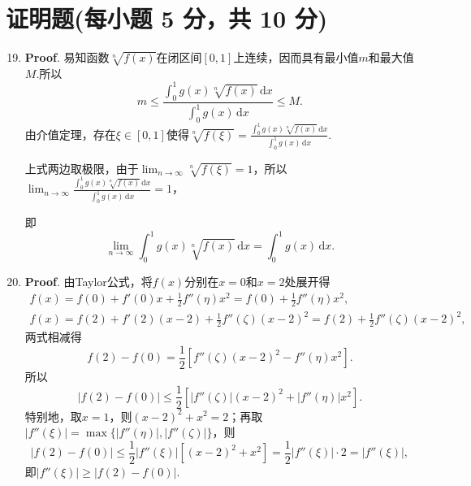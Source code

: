 \documentclass[../main.tex]{subfiles}
\begin{document}
\section{证明题(每小题 5 分，共 10 分)}
\begin{enumerate}
    \setcounter{enumi}{18}
    \item \textbf{Proof}. 易知函数$\sqrt[n]{f(x)}$在闭区间$[0,1]$上连续，因而具有最小值$m$和最大值$M$.所以
          \[
              m\leq \frac{\displaystyle\int_{0}^{1}g(x)\sqrt[n]{f(x)}\,\mathrm{d}x}{\displaystyle\int_{0}^{1}g(x)\,\mathrm{d}x}
              \leq M.
          \]
          由介值定理，存在$\xi\in[0,1]$使得$\sqrt[n]{f(\xi)}=\frac{\displaystyle\int_{0}^{1}g(x)\sqrt[n]{f(x)}\,\mathrm{d}x}{\displaystyle\int_{0}^{1}g(x)\,\mathrm{d}x}$.

          上式两边取极限，由于$\lim_{n\to\infty}\sqrt[n]{f(\xi)}=1$，所以$\lim_{n\to\infty}
              \frac{\displaystyle\int_{0}^{1}g(x)\sqrt[n]{f(x)}\,\mathrm{d}x}{\displaystyle\int_{0}^{1}g(x)\,\mathrm{d}x}
              =1$，

          即
          \[
              \lim_{n\to\infty}\int_{0}^{1}g(x)\sqrt[n]{f(x)}\,\mathrm{d}x=\int_{0}^{1}g
              (x)\,\mathrm{d}x.
          \]

    \item \textbf{Proof}. 由Taylor公式，将$f(x)$分别在$x=0$和$x=2$处展开得
          \[
              \begin{gathered}
                  f(x)=f(0)+f'(0)x+\frac{1}{2}f''(\eta)x^2=f(0)+\frac{1}{2}f''(\eta)x^2,\\
                  f(x)=f(2)+f'(2)(x-2)+\frac{1}{2}f''(\zeta)(x-2)^2=f(2)+\frac{1}{2}f''(\zeta)(x-2)^2,
              \end{gathered}
          \]
          两式相减得
          \[
              f(2)-f(0)=\frac{1}{2}\left[f''(\zeta)(x-2)^{2}-f''(\eta)x^{2}\right].
          \]
          所以
          \[
              |f(2)-f(0)|\leq\frac{1}{2}\left[\left|f''(\zeta)\right|(x-2)^{2}+\left|f''(\eta)\right|x^{2}\right].
          \]
          特别地，取$x=1$，则$(x-2)^{2}+x^{2}=2$；再取$|f''(\xi)|=\max\{|f''(\eta)|,|f''(\zeta)|\}$，则
          \[
              |f(2)-f(0)|\leq\frac{1}{2}|f''(\xi)|\left[(x-2)^{2}+x^{2}\right]= \frac{1}{2}
              |f''(\xi)|\cdot 2=|f''(\xi)|,
          \]
          即$|f''(\xi)|\geq|f(2)-f(0)|$.
\end{enumerate}
\end{document}

